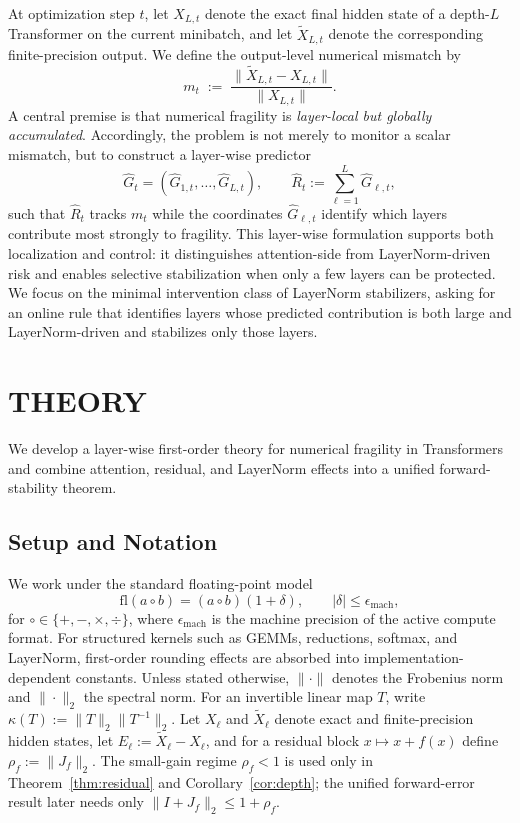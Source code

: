 \documentclass[twoside]{article}
\theoremstyle{definition}
\theoremstyle{remark}
\begin{document}
At optimization step $t$, let $X_{L,t}$ denote the exact final hidden state of a depth-$L$
Transformer on the current minibatch, and let $\widetilde{X}_{L,t}$ denote the corresponding
finite-precision output. We define the output-level numerical mismatch by
\begin{equation}
\label{eq:pf_mismatch}
m_t
\;:=\;
\frac{\|\widetilde{X}_{L,t}-X_{L,t}\|}{\|X_{L,t}\|}.
\end{equation}
A central premise is that numerical fragility is \emph{layer-local but globally
accumulated}. Accordingly, the problem is not merely to monitor a scalar
mismatch, but to construct a
layer-wise predictor
\[
\widehat{G}_t
=
(\widehat{G}_{1,t},\dots,\widehat{G}_{L,t}),
\qquad
\widehat{R}_t
:=
\sum_{\ell=1}^{L}\widehat{G}_{\ell,t},
\]
such that $\widehat{R}_t$ tracks $m_t$ while the coordinates
$\widehat{G}_{\ell,t}$ identify which layers contribute most strongly to
fragility. This layer-wise formulation supports both localization and control:
it distinguishes attention-side from LayerNorm-driven risk and enables
selective stabilization when only a few layers can be protected. We focus on
the minimal intervention class of LayerNorm stabilizers, asking for an online
rule that identifies layers whose predicted contribution is both large and
LayerNorm-driven and stabilizes only those layers.

\section{THEORY}
\label{sec:theory}

We develop a layer-wise first-order theory for numerical fragility in
Transformers and combine attention, residual, and LayerNorm effects into a
unified forward-stability theorem.

\subsection{Setup and Notation}
\label{subsec:setup}

We work under the standard floating-point model
\[
\mathrm{fl}(a \circ b) = (a \circ b)(1+\delta),
\qquad
|\delta| \le \epsilon_{\mathrm{mach}},
\]
for $\circ \in \{+,-,\times,\div\}$, where $\epsilon_{\mathrm{mach}}$ is the
machine precision of the active compute format. For structured kernels such as
GEMMs, reductions, softmax, and LayerNorm, first-order rounding effects are
absorbed into implementation-dependent constants. Unless stated otherwise,
$\|\cdot\|$ denotes the Frobenius norm and $\|\cdot\|_2$ the spectral norm.
For an invertible linear map $T$, write $\kappa(T):=\|T\|_2\|T^{-1}\|_2$. Let
$X_\ell$ and $\widetilde{X}_\ell$ denote exact and finite-precision hidden
states, let $E_\ell:=\widetilde{X}_\ell-X_\ell$, and for a residual block
$x\mapsto x+f(x)$ define $\rho_f:=\|J_f\|_2$. The
small-gain regime $\rho_f<1$ is used only in Theorem~\ref{thm:residual} and
Corollary~\ref{cor:depth}; the unified forward-error result later needs only
$\|I+J_f\|_2 \le 1+\rho_f$.
\end{document}
